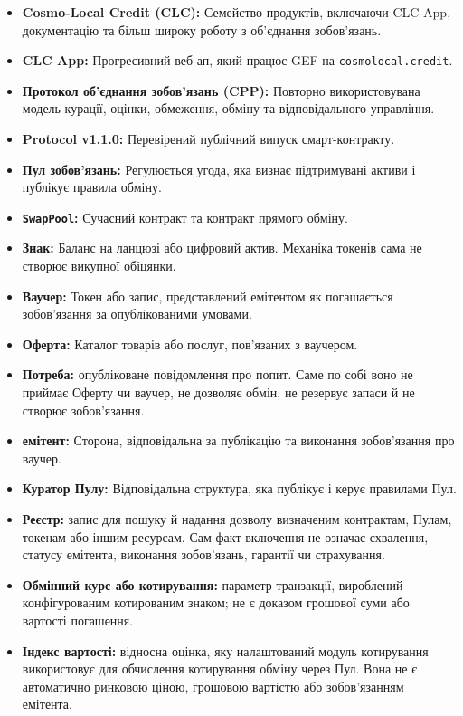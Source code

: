 \documentclass[11pt]{article}
\begin{document}
\begin{itemize}[leftmargin=*]
\item \textbf{Cosmo-Local Credit (CLC):} Семейство продуктів, включаючи CLC App, документацію та більш широку роботу з об'єднання зобов'язань.
\item \textbf{CLC App:} Прогресивний веб-ап, який працює GEF на \texttt{cosmolocal.credit}.
\item \textbf{Протокол об'єднання зобов'язань (CPP):} Повторно використовувана модель курації, оцінки, обмеження, обміну та відповідального управління.
\item \textbf{Protocol v1.1.0:} Перевірений публічний випуск смарт-контракту.
\item \textbf{Пул зобов'язань:} Регулюється угода, яка визнає підтримувані активи і публікує правила обміну.
\item \textbf{\texttt{SwapPool}:} Сучасний контракт та контракт прямого обміну.
\item \textbf{Знак:} Баланс на ланцюзі або цифровий актив. Механіка токенів сама не створює викупної обіцянки.
\item \textbf{Ваучер:} Токен або запис, представлений емітентом як погашається зобов'язання за опублікованими умовами.
\item \textbf{Оферта:} Каталог товарів або послуг, пов'язаних з ваучером.
\item \textbf{Потреба:} опубліковане повідомлення про попит. Саме по собі воно не приймає Оферту чи ваучер, не дозволяє обмін, не резервує запаси й не створює зобов'язання.
\item \textbf{емітент:} Сторона, відповідальна за публікацію та виконання зобов'язання про ваучер.
\item \textbf{Куратор Пулу:} Відповідальна структура, яка публікує і керує правилами Пул.
\item \textbf{Реєстр:} запис для пошуку й надання дозволу визначеним контрактам, Пулам, токенам або іншим ресурсам. Сам факт включення не означає схвалення, статусу емітента, виконання зобов'язань, гарантії чи страхування.
\item \textbf{Обмінний курс або котирування:} параметр транзакції, вироблений конфігурованим котированим знаком; не є доказом грошової суми або вартості погашення.
\item \textbf{Індекс вартості:} відносна оцінка, яку налаштований модуль котирування використовує для обчислення котирування обміну через Пул. Вона не є автоматично ринковою ціною, грошовою вартістю або зобов'язанням емітента.

\end{itemize}
\end{document}
